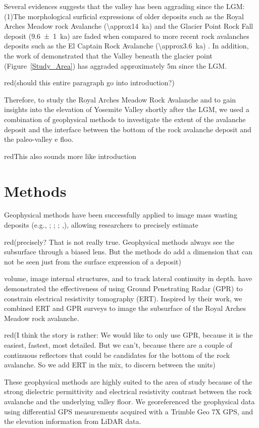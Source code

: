 \documentclass[5p]{elsarticle}
\newcommand{\alon}{\begin{color}{red}}
\newcommand{\aloff}{\end{color}}
\begin{document}
Several evidences suggests that the valley has been aggrading since the LGM: (1)The morphological surficial expressions of older deposits such as the Royal Arches Meadow rock Avalanche (\SI{\approx14}{\kilo a}) and the Glacier Point Rock Fall deposit (\SI{9.6 \pm 1}{\kilo a}) \citep{cordes2013supporting} are faded when compared to more recent rock avalanches deposits such as the El Captain Rock Avalanche (\SI{\approx3.6}{\kilo a}) \citep{stock2010catastrophic}. In addition, the work of \cite{cordes2013supporting} demonstrated that the Valley beneath the glacier point (Figure~\ref{Study_Area}) has aggraded approximately 5m since the LGM. \alon(should this entire paragraph go into introduction?)\aloff

Therefore, to study the Royal Arches Meadow Rock Avalanche and to gain insights into the elevation of Yosemite Valley shortly after the LGM, we used a combination of geophysical methods to investigate the extent of the avalanche deposit and the interface between the bottom of the rock avalanche deposit and the paleo-valley e floo. \alon This also sounds more like introduction \aloff



\section{Methods}

Geophysical methods have been successfully applied to image mass wasting deposits (e.g., \cite{sass2006determination}; \cite{otto2006comparing}; \cite{socco2010geophysical}; \cite{brody2015near},\cite{liu2018near}), allowing researchers to precisely estimate \alon (precisely? That is not really true. Geophysical methods always see the subsurface through a biased lens. But the methods do add a dimension that can not be seen just from the surface expression of a deposit)\aloff volume, image internal structures, and to track lateral continuity in depth. \cite{doetsch2012constraining} have demonstrated the effectiveness of using Ground Penetrating Radar (GPR) to constrain electrical resistivity tomography (ERT). Inspired by their work, we combined ERT and GPR surveys to image the subsurface of the Royal Arches Meadow rock avalanche. \alon (I think the story is rather: We would like to only use GPR, because it is the easiest, fastest, most detailed. But we can't, because there are a couple of continuous reflectors that could be candidates for the bottom of the rock avalanche. So we add ERT in the mix, to discern between the units) \aloff These geophysical methods are highly suited to the area of study because of the strong dielectric permittivity and electrical resistivity contrast between the rock avalanche and the underlying valley floor. We georeferenced the geophysical data using differential GPS measurements acquired with a Trimble Geo 7X GPS, and the elevation information from LiDAR data.
\end{document}
